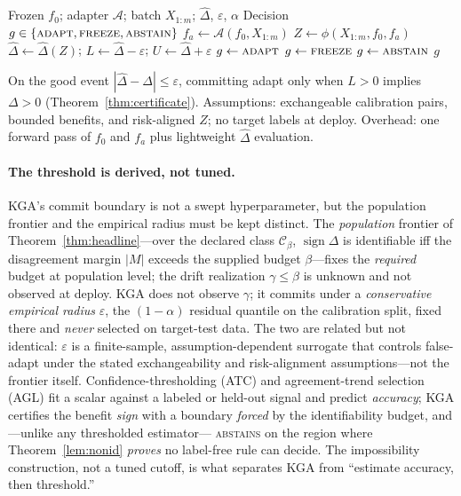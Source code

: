 \documentclass[conference]{IEEEtran}
\theoremstyle{plain}
\theoremstyle{definition}
\theoremstyle{remark}
\newcommand{\sign}{\operatorname{sign}}
\begin{document}
\begin{algorithm}[t]
\caption{\textsc{KGA}: Knowability-Guided Adaptation}
\label{alg:kga}
\begin{algorithmic}[1]
\Require Frozen $f_0$; adapter $\mathcal{A}$; batch $X_{1:m}$; $\widehat\Delta$, $\varepsilon$, $\alpha$
\Ensure Decision $g\in\{\textsc{adapt},\textsc{freeze},\textsc{abstain}\}$
\State $f_a \leftarrow \mathcal{A}(f_0, X_{1:m})$
\State $Z \leftarrow \phi(X_{1:m}, f_0, f_a)$
\State $\widehat\Delta \leftarrow \widehat\Delta(Z)$;\;
  $L \leftarrow \widehat\Delta-\varepsilon$;\; $U \leftarrow \widehat\Delta+\varepsilon$
 \State $g\leftarrow\textsc{adapt}$
 \State $g\leftarrow\textsc{freeze}$
\Else \State $g\leftarrow\textsc{abstain}$
\EndIf
\State \Return $g$
\end{algorithmic}
\end{algorithm}

On the good event $|\widehat\Delta-\Delta|\le\varepsilon$, committing adapt only when
$L>0$ implies $\Delta>0$ (Theorem~\ref{thm:certificate}). Assumptions: exchangeable
calibration pairs, bounded benefits, and risk-aligned $Z$; no target labels at deploy.
Overhead: one forward pass of $f_0$ and $f_a$ plus lightweight $\widehat\Delta$ evaluation.

\paragraph{The threshold is derived, not tuned.}
\textsc{KGA}'s commit boundary is not a swept hyperparameter, but the population frontier and the
empirical radius must be kept distinct. The \emph{population} frontier of
Theorem~\ref{thm:headline}---over the declared class $\mathcal C_\beta$, $\sign\Delta$ is
identifiable iff the disagreement margin $|M|$ exceeds the supplied budget $\beta$---fixes the
\emph{required} budget at population level; the drift realization $\gamma\le\beta$ is unknown and
not observed at deploy. \textsc{KGA} does not
observe $\gamma$; it commits under a \emph{conservative empirical radius} $\varepsilon$, the
$(1-\alpha)$ residual quantile on the calibration split, fixed there and \emph{never} selected on
target-test data. The two are related but not identical: $\varepsilon$ is a finite-sample,
assumption-dependent surrogate that controls false-adapt under the stated exchangeability and
risk-alignment assumptions---not the frontier itself. Confidence-thresholding (ATC) and
agreement-trend selection (AGL) fit a scalar against a labeled or held-out signal and
predict \emph{accuracy}; \textsc{KGA} certifies the benefit \emph{sign} with a boundary
\emph{forced} by the identifiability budget, and---unlike any thresholded estimator---%
\textsc{abstains} on the region where Theorem~\ref{lem:nonid} \emph{proves} no label-free
rule can decide. The impossibility construction, not a tuned cutoff, is what separates
\textsc{KGA} from ``estimate accuracy, then threshold.''
\end{document}
